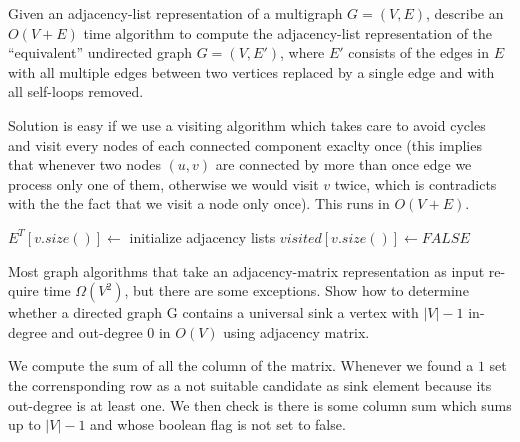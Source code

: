 \begin{problem}
Given an adjacency-list representation of a multigraph  $G = (V,E)$, describe an
$O(V + E)$ time algorithm to compute the adjacency-list representation of the
“equivalent” undirected graph  $G = (V,E')$, where $E'$ consists of the edges in $E$
with all multiple edges between two vertices replaced by a single edge and with all
self-loops removed.

\begin{solution}
Solution is easy if we use a visiting algorithm which takes care to avoid cycles and visit every nodes of each connected component exaclty once (this implies that whenever two nodes $(u,v)$ are connected by more than once edge we process only one of them, otherwise we would visit $v$ twice, which is contradicts with the the fact that we visit a node only once). This runs in $O(V+E)$.

	\begin{algorithm}
 $E^T[v.size()] \gets $ initialize adjacency lists\;
 $visited[v.size()] \gets FALSE$\;

\;
\end{algorithm}


\end{solution}
\end{problem}

\begin{problem}
Most graph algorithms that take an adjacency-matrix representation as input re-
quire time $\Omega(V^2)$, but there are some exceptions. Show how to determine whether
a directed graph G contains a universal sink a vertex with $|V|-1$ in-degree and out-degree $0$ in $O(V)$ using adjacency matrix.
\begin{solution}
We compute the sum of all the column of the matrix. Whenever we found a $1$ set the corrensponding row as a not suitable candidate as sink element because its out-degree is at least one.
We then check is there is some column sum which sums up to $|V|-1$ and whose boolean flag is not set to false.

\end{solution}
\end{problem}

